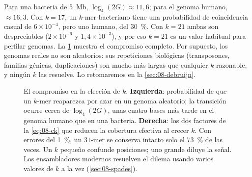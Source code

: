 Para una bacteria de \SI{5}{Mb}, $\log_4 (2G) \approx 11{,}6$; para el genoma humano, $\approx16{,}3$. Con $k=17$, un $k$-mer bacteriano tiene una probabilidad de coincidencia casual de $6\times10^{-4}$, pero uno humano, del \SI{30}{\percent}. Con $k=21$ ambas son despreciables ($2\times10^{-6}$ y $1{,}4\times10^{-3}$), y por eso $k=21$ es un valor habitual para perfilar genomas. La \cref{fig:08-kelec} muestra el compromiso completo. Por supuesto, los genomas reales no son aleatorios: sus repeticiones biológicas (transposones, familias génicas, duplicaciones) son mucho más largas que cualquier $k$ razonable, y ningún $k$ las resuelve. Lo retomaremos en la \cref{sec:08-debruijn}.

\begin{figure}[t]
\centering
{}
\caption[El compromiso en la elección de $k$]{El compromiso en la elección de $k$. \textbf{Izquierda}: probabilidad de que un $k$-mer reaparezca por azar en un genoma aleatorio; la transición ocurre cerca de $\log_4(2G)$, unas cuatro bases más tarde en el genoma humano que en una bacteria. \textbf{Derecha}: los dos factores de la \cref{eq:08-ck} que reducen la cobertura efectiva al crecer $k$. Con errores del \SI{1}{\percent}, un $31$-mer se conserva intacto solo el \SI{73}{\percent} de las veces. Un $k$ pequeño confunde posiciones; uno grande diluye la señal. Los ensambladores modernos resuelven el dilema usando varios valores de $k$ a la vez (\cref{sec:08-spades}).}
\label{fig:08-kelec}
\end{figure}

